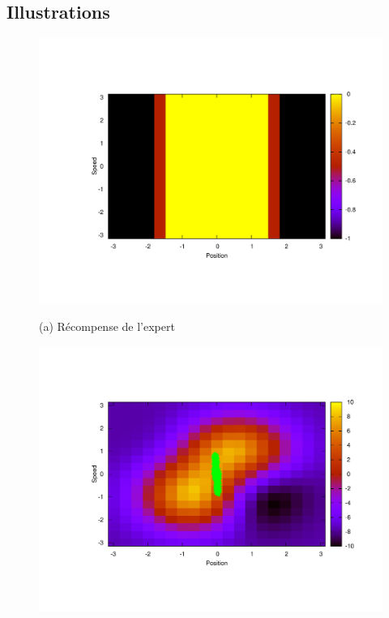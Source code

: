 \documentclass{article}
\begin{document}
\subsection{Illustrations}
\begin{figure}[ht]
\vskip 0.2in
\begin{center}
\begin{minipage}[b]{.5\linewidth}
  \centering
  \centerline{\includegraphics[width=\columnwidth]{LAFEM_Exp3_true_R.pdf}}
  \centerline{(a) Récompense de l'expert}%
\end{minipage}
\hfill
\begin{minipage}[b]{.5\linewidth}
  \centering
  \centerline{\includegraphics[width=\columnwidth]{LAFEM_Exp3_lafem_R.pdf}}

\end{minipage}
\end{center}
\end{figure}
\end{document}
